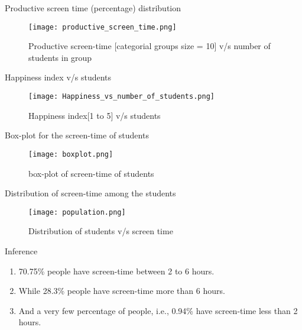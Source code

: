 \documentclass{beamer}
\begin{document}
\begin{frame}
\begin{block}{Productive screen time (percentage) distribution}
\begin{figure}[hbtp]
\caption{Productive screen-time [categorial groups size = 10] v/s number of students in group}
\centering
\texttt{[image: productive\_screen\_time.png]}
\end{figure}
\end{block}
\end{frame}

\begin{frame}
\begin{block}{Happiness index v/s students}
\begin{figure}[hbtp]
\caption{Happiness index[1 to 5] v/s students}
\centering
\texttt{[image: Happiness\_vs\_number\_of\_students.png]}
\end{figure}
\end{block}
\end{frame}


\begin{frame}
\begin{block}{Box-plot for the screen-time of students}
\begin{figure}[hbtp]
\caption{box-plot of screen-time of students}
\centering
\texttt{[image: boxplot.png]}
\end{figure}
\end{block}
\end{frame}

\begin{frame}
\begin{block}{Distribution of screen-time among the students}
\begin{figure}[hbtp]
\caption{Distribution of students v/s screen time}
\centering
\texttt{[image: population.png]}
\end{figure}
\end{block}
\end{frame}

\begin{frame}
\begin{block}{Inference}
\begin{enumerate}
\item 70.75\% people have screen-time between 2 to 6 hours. 
\item While 28.3\% people have screen-time more than 6 hours.
\item And a very few percentage of people, i.e., 0.94\% have screen-time less than 2 hours.
\end{enumerate}
\end{block}
\end{frame}
\end{document}
